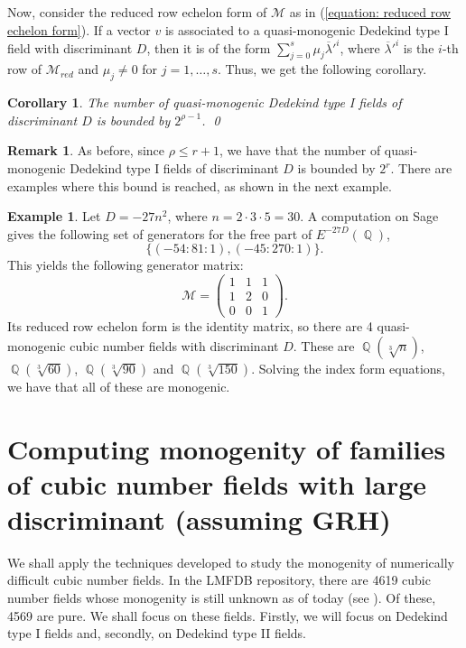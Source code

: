 \documentclass[oneside]{amsart}
\DeclareMathOperator{\QQ}{\mathbb{Q}}
\newtheorem{corollary}[X]{Corollary}
\theoremstyle{definition}
\newtheorem{example}[X]{Example}
\newtheorem{remark}[X]{Remark}
\begin{document}
Now, consider the reduced row echelon form of $\mathcal{M}$ as in (\ref{equation: reduced row echelon form}). If a vector $v$ is associated to a quasi-monogenic Dedekind type I field with discriminant $D$, then it is of the form $\sum_{j = 0}^s\mu_j\overline{\lambda}'^i$, where $\overline{\lambda}'^i$ is the $i$-th row of $\mathcal{M}_{red}$ and $\mu_j \neq 0$ for $j = 1,\dots, s$. Thus, we get the following corollary.
\begin{corollary}
    The number of quasi-monogenic Dedekind type I fields of discriminant $D$ is bounded by $2^{\rho - 1}$. \qed
\end{corollary}
\begin{remark}
    As before, since $\rho \leq r + 1$, we have that the number of quasi-monogenic Dedekind type I fields of discriminant $D$ is bounded by $2^r$. There are examples where this bound is reached, as shown in the next example.  
\end{remark}
\begin{example}
    Let $D = -27n^2$, where $n = 2\cdot 3\cdot 5 = 30$. A computation on Sage gives the following set of generators for the free part of $E^{-27D}(\QQ)$,
    $$
    \{(-54 : 81 : 1), (-45 : 270 : 1)\}.
    $$
    This yields the following generator matrix: 
    $$
    \mathcal{M} = 
    \begin{pmatrix}
        1&1&1\\
        1&2&0\\
        0&0&1
    \end{pmatrix}.
    $$
    Its reduced row echelon form is the identity matrix, so there are 4 quasi-monogenic cubic number fields with discriminant $D$. These are $\QQ(\sqrt[3]{n})$, $\QQ(\sqrt[3]{60})$, $\QQ(\sqrt[3]{90})$ and $\QQ(\sqrt[3]{150})$. Solving the index form equations, we have that all of these are monogenic.
\end{example}

\section{Computing monogenity of families of cubic number fields with large discriminant (assuming GRH)}
\label{section: computations}

We shall apply the techniques developed to study the monogenity of numerically difficult cubic number fields. In the LMFDB repository, there are 4619 cubic number fields whose monogenity is still unknown as of today (see \cite[\href{https://www.lmfdb.org/NumberField/?degree=3&monogenic=unknown}{List of cubic number fields with unknown monogenity}]{lmfdb}). Of these, 4569 are pure. We shall focus on these fields. Firstly, we will focus on Dedekind type I fields and, secondly, on Dedekind type II fields.
\end{document}
